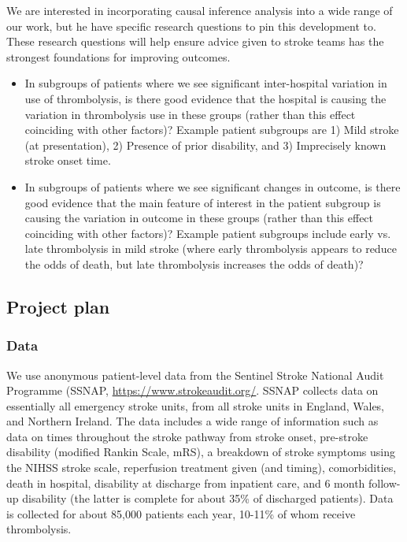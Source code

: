 We are interested in incorporating causal inference analysis into a wide range of our work, but he have specific research questions to pin this development to. These research questions will help ensure advice given to stroke teams has the strongest foundations for improving outcomes.

\begin{itemize}
    \item In subgroups of patients where we see significant inter-hospital variation in use of thrombolysis, is there good evidence that the hospital is causing the variation in thrombolysis use in these groups (rather than this effect coinciding with other factors)? Example patient subgroups are 1) Mild stroke (at presentation), 2) Presence of prior disability, and 3) Imprecisely known stroke onset time.

    \item In subgroups of patients where we see significant changes in outcome, is there good evidence that the main feature of interest in the patient subgroup is causing the variation in outcome in these groups (rather than this effect coinciding with other factors)? Example patient subgroups include early vs. late thrombolysis in mild stroke (where early thrombolysis appears to reduce the odds of death, but late thrombolysis increases the odds of death)?
\end{itemize}


\subsection{Project plan}

\subsubsection{Data}

We use anonymous patient-level data from the Sentinel Stroke National Audit Programme (SSNAP, \url{https://www.strokeaudit.org/}. SSNAP collects data on essentially all emergency stroke units, from all stroke units in England, Wales, and Northern Ireland. The data includes a wide range of information such as data on times throughout the stroke pathway from stroke onset, pre-stroke disability (modified Rankin Scale, mRS), a breakdown of stroke symptoms using the NIHSS stroke scale, reperfusion treatment given (and timing), comorbidities, death in hospital, disability at discharge from inpatient care, and 6 month follow-up disability (the latter is complete for about 35\% of discharged patients). Data is collected for about 85,000 patients each year, 10-11\% of whom receive thrombolysis.

